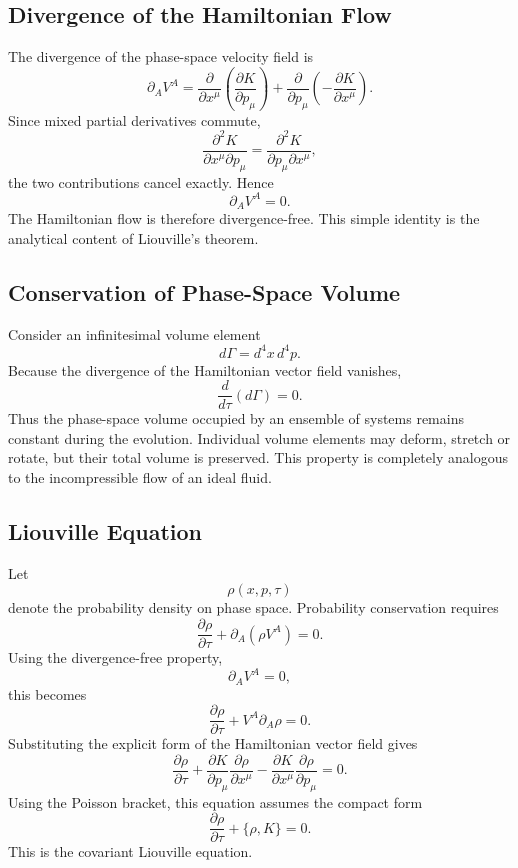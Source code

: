 \subsection{Divergence of the Hamiltonian Flow}
The divergence of the phase-space velocity field is
\[\partial_A V^A=
\frac{\partial}{\partial x^\mu}
\left(\frac{\partial K}{\partial p_\mu}\right)
+\frac{\partial}{\partial p_\mu}\left(-\frac{\partial K}{\partial x^\mu}\right).\]
Since mixed partial derivatives commute,
\[\frac{\partial^2K}{\partial x^\mu\partial p_\mu}=
\frac{\partial^2K}{\partial p_\mu\partial x^\mu},\]
the two contributions cancel exactly.
Hence
\[\boxed{\partial_A V^A=0.}\]
The Hamiltonian flow is therefore divergence-free.
This simple identity is the analytical content of Liouville's theorem.
\subsection{Conservation of Phase-Space Volume}
Consider an infinitesimal volume element
\[d\Gamma=d^4x\,d^4p.\]
Because the divergence of the Hamiltonian vector field vanishes,
\[\boxed{\frac{d}{d\tau}(d\Gamma)=0.}\]
Thus the phase-space volume occupied by an ensemble of systems remains
constant during the evolution.
Individual volume elements may deform, stretch or rotate, but their
total volume is preserved.
This property is completely analogous to the incompressible flow of an
ideal fluid.
\subsection{Liouville Equation}
Let
\[\rho(x,p,\tau)\]
denote the probability density on phase space.
Probability conservation requires
\[\frac{\partial\rho}{\partial\tau}+\partial_A(\rho V^A)=0.\]
Using the divergence-free property,
\[\partial_A V^A=0,\]
this becomes
\[\boxed{\frac{\partial\rho}{\partial\tau}+V^A\partial_A\rho=0.}\]
Substituting the explicit form of the Hamiltonian vector field gives
\[\boxed{\frac{\partial\rho}{\partial\tau}+
\frac{\partial K}{\partial p_\mu}\frac{\partial\rho}{\partial x^\mu}-
\frac{\partial K}{\partial x^\mu}\frac{\partial\rho}{\partial p_\mu}
=0.}\]
Using the Poisson bracket, this equation assumes the compact form
\[\boxed{\frac{\partial\rho}{\partial\tau}+\{\rho,K\}=0.}\]
This is the covariant Liouville equation.
